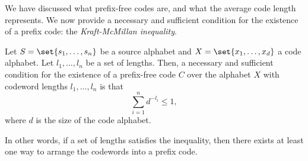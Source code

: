 \documentclass{subfiles}
\begin{document}
    We have discussed what prefix-free codes are, and what the average code length represents.
        We now provide a necessary and sufficient condition for the existence of a prefix code:
        the \emph{Kraft-McMillan inequality}.

    \begin{theorem}\label{Thm:2}
        Let \(S = \set{s_{1}, \ldots, s_{n}}\) be a source alphabet and \(X = \set{x_{1}, \ldots, x_{d}}\) a code alphabet.
            Let \(l_{1}, \ldots, l_{n}\) be a set of lengths.
            Then, a necessary and sufficient condition for the existence of a 
        prefix-free code \(C\) over the alphabet \(X\) with codeword lengths 
        \(l_{1}, \ldots, l_{n}\) is that 
        \[
            \sum_{i = 1}^{n}{d^{-l_{i}}} \le 1,
        \]
        where \(d\) is the size of the code alphabet.
    \end{theorem}

    In other words, if a set of lengths satisfies the inequality, then
        there exists at least one way to arrange the codewords into a prefix code.
\end{document}
